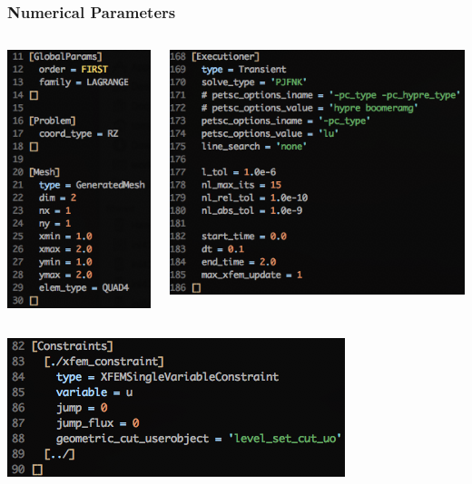 \documentclass[]{beamer}
\begin{document}
\begin{frame}\frametitle{Numerical Parameters}
  	\begin{columns}
			\begin{center}
			\includegraphics[scale=0.4]{figures/Screen-GlobalParams-2Drzls1m}
			\end{center}
			\begin{center}
			\includegraphics[scale=0.4]{figures/Screen-Executioner-2Drzls1m}
			\end{center}
	\end{columns}
	\begin{center}
	\includegraphics[scale=0.4]{figures/Screen-Constraints-2Drzls1m}
	\end{center}
\end{frame}
\end{document}

